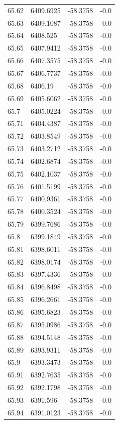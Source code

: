 \begin{table}[H]
\begin{tabular}{llll}
65.62 & 6409.6925 & -58.3758 & -0.0 \\
65.63 & 6409.1087 & -58.3758 & -0.0 \\
65.64 & 6408.525 & -58.3758 & -0.0 \\
65.65 & 6407.9412 & -58.3758 & -0.0 \\
65.66 & 6407.3575 & -58.3758 & -0.0 \\
65.67 & 6406.7737 & -58.3758 & -0.0 \\
65.68 & 6406.19 & -58.3758 & -0.0 \\
65.69 & 6405.6062 & -58.3758 & -0.0 \\
65.7 & 6405.0224 & -58.3758 & -0.0 \\
65.71 & 6404.4387 & -58.3758 & -0.0 \\
65.72 & 6403.8549 & -58.3758 & -0.0 \\
65.73 & 6403.2712 & -58.3758 & -0.0 \\
65.74 & 6402.6874 & -58.3758 & -0.0 \\
65.75 & 6402.1037 & -58.3758 & -0.0 \\
65.76 & 6401.5199 & -58.3758 & -0.0 \\
65.77 & 6400.9361 & -58.3758 & -0.0 \\
65.78 & 6400.3524 & -58.3758 & -0.0 \\
65.79 & 6399.7686 & -58.3758 & -0.0 \\
65.8 & 6399.1849 & -58.3758 & -0.0 \\
65.81 & 6398.6011 & -58.3758 & -0.0 \\
65.82 & 6398.0174 & -58.3758 & -0.0 \\
65.83 & 6397.4336 & -58.3758 & -0.0 \\
65.84 & 6396.8498 & -58.3758 & -0.0 \\
65.85 & 6396.2661 & -58.3758 & -0.0 \\
65.86 & 6395.6823 & -58.3758 & -0.0 \\
65.87 & 6395.0986 & -58.3758 & -0.0 \\
65.88 & 6394.5148 & -58.3758 & -0.0 \\
65.89 & 6393.9311 & -58.3758 & -0.0 \\
65.9 & 6393.3473 & -58.3758 & -0.0 \\
65.91 & 6392.7635 & -58.3758 & -0.0 \\
65.92 & 6392.1798 & -58.3758 & -0.0 \\
65.93 & 6391.596 & -58.3758 & -0.0 \\
65.94 & 6391.0123 & -58.3758 & -0.0 \\

\end{tabular}
\end{table}
